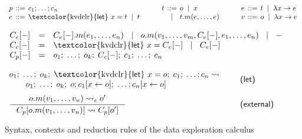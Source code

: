 \documentclass[english,crc,references=cleveref]{programming}
\theoremstyle{plain}
\theoremstyle{definition}
\newcommand{\lsep}{\;\;|\;\;}
\newcommand{\kvd}[1]{\textnormal{\textcolor{kvdclr}{\sffamily #1}}}
\newcommand{\narrow}[1]{\hspace{-0.6em}#1\hspace{-0.6em}}
\newcommand{\rname}[1]{{\sffamily(#1)}}
\begin{document}
\begin{figure}
\raggedright
\hspace{0.5em}{\sffamily Programs, commands, terms, expressions and values}
%
\begin{equation*}
\begin{array}{lcl}
p &\narrow{::=}& c_1; \ldots; c_n\\
c &\narrow{::=}& \kvd{let}~x = t \lsep t\\
\end{array}
\qquad
\begin{array}{lcl}
t &\narrow{::=}& o \lsep x \\
  &\narrow{|}& t.m(e, \ldots, e)
\end{array}
\qquad
\begin{array}{lcl}
e &\narrow{::=}& t \lsep \lambda x\rightarrow e\\
v &\narrow{::=}& o \lsep \lambda x\rightarrow e\\
\end{array}
\end{equation*}

%
\hspace{0.5em}{\sffamily Evaluation contexts of expressions}
%
\begin{equation*}
\begin{array}{lcl}
C_e[-] &=& C_e[-].m(e_1, \ldots, e_n) ~\lsep~ o.m(v_1, \ldots, v_{m}, C_e[-], e_1,\ldots , e_n) ~\lsep~ -\\
C_c[-] &=& \kvd{let}~x = C_e[-] ~\lsep~ C_e[-]\\
C_p[-] &=& o_1;\; \ldots;\; o_{k};\; C_c[-];\; c_{1};\; \ldots;\; c_n\\
\end{array}
\end{equation*}

%
\hspace{0.5em}{\sffamily Let elimination and member reduction}
%
\begin{equation*}
\begin{array}{ll}
\hspace{-0.5em}\begin{array}{l}
o_1;\; \ldots;\; o_{k};\; \kvd{let}~x=o;\; c_{1};\; \ldots; c_n \rightsquigarrow\\
\qquad  o_1;\; \ldots;\; o_{k};\; o; c_{1}[x\leftarrow o];\; \ldots; c_n[x\leftarrow o]\end{array} &
\quad\text{\rname{let}}\\[1.2em]
\inference
  {o.m(v_1, \ldots, v_n) \rightsquigarrow_\epsilon o'}
  {C_p[o.m(v_1, \ldots, v_n)] \rightsquigarrow C_p[o']} &
\quad\text{\rname{external}}
\end{array}
\end{equation*}

\caption{Syntax, contexts and reduction rules of the data exploration calculus}
\label{fig:dec-calculus}
\end{figure}
\end{document}
